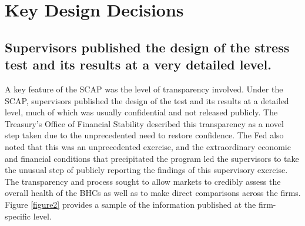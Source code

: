 \documentclass[justified, nobib]{tufte-handout2}
\begin{document}
\section{Key Design Decisions}

\subsection{Supervisors published the design of the stress test and
its results at a very detailed
level.}

A key feature of the SCAP was the level of transparency involved. Under
the SCAP, supervisors published the design of the test and its
results at a detailed level, much of which was usually confidential and
not released publicly. The Treasury's Office of Financial Stability
described this transparency as a novel step taken due to the
unprecedented need to restore confidence. The Fed also noted that this
was an unprecedented exercise, and the extraordinary economic and
financial conditions that precipitated the program led the supervisors
to take the unusual step of publicly reporting the findings of this
supervisory exercise. The transparency and process sought to allow
markets to credibly assess the overall health of the BHCs as well
as to make direct comparisons across the firms. Figure \ref{figure2} provides a sample
of the information published at the firm-specific level.
\end{document}
